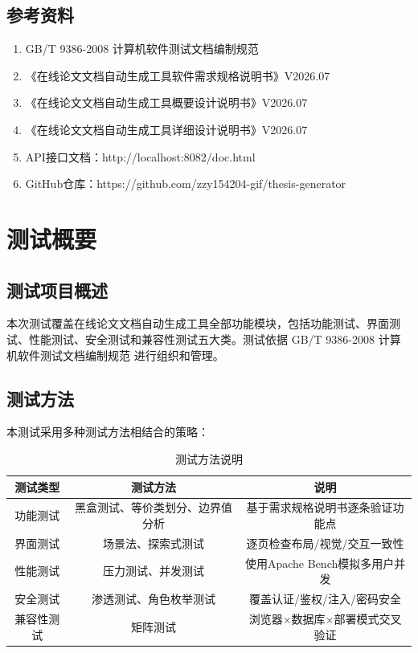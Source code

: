 \documentclass{../softeng}
\begin{document}
\subsection{参考资料}
\begin{enumerate}
    \item GB/T 9386-2008 计算机软件测试文档编制规范
    \item 《在线论文文档自动生成工具软件需求规格说明书》V2026.07
    \item 《在线论文文档自动生成工具概要设计说明书》V2026.07
    \item 《在线论文文档自动生成工具详细设计说明书》V2026.07
    \item API接口文档：http://localhost:8082/doc.html
    \item GitHub仓库：https://github.com/zzy154204-gif/thesis-generator
\end{enumerate}

\section{测试概要}

\subsection{测试项目概述}
本次测试覆盖在线论文文档自动生成工具全部功能模块，包括功能测试、界面测试、性能测试、安全测试和兼容性测试五大类。测试依据 GB/T 9386-2008 计算机软件测试文档编制规范 进行组织和管理。

\subsection{测试方法}

本测试采用多种测试方法相结合的策略：

\begin{table}[htbp]
    \centering
    \caption{测试方法说明}
    \begin{tabular}{|c|c|c|}
        \hline
        \textbf{测试类型} & \textbf{测试方法} & \textbf{说明} \\
        \hline
        功能测试 & 黑盒测试、等价类划分、边界值分析 & 基于需求规格说明书逐条验证功能点 \\
        \hline
        界面测试 & 场景法、探索式测试 & 逐页检查布局/视觉/交互一致性 \\
        \hline
        性能测试 & 压力测试、并发测试 & 使用Apache Bench模拟多用户并发 \\
        \hline
        安全测试 & 渗透测试、角色枚举测试 & 覆盖认证/鉴权/注入/密码安全 \\
        \hline
        兼容性测试 & 矩阵测试 & 浏览器×数据库×部署模式交叉验证 \\
        \hline
    \end{tabular}
\end{table}
\end{document}

